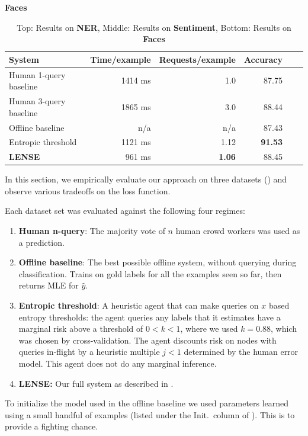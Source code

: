 \begin{table}[ht]
{\bf Faces}\\
\begin{tabular}{l  r  r  r  r  r}
    \textbf{System} & \textbf{Time/example} & \textbf{Requests/example} & \textbf{Accuracy} \\ \hline
    Human 1-query baseline & 1414 ms & 1.0 & 87.75 \\ %
    Human 3-query baseline & 1865 ms & 3.0 & 88.44 \\ %
    Offline baseline & n/a & n/a & 87.43 \\    %
    Entropic threshold & 1121 ms & 1.12 & \textbf{91.53} \\ %
    \textbf{LENSE} & 961 ms & \textbf{1.06} & 88.45 \\   %
\end{tabular}
  \caption{Top: Results on {\bf NER}, Middle: Results on {\bf Sentiment}, Bottom: Results on {\bf Faces}}
\end{table}

In this section, we empirically evaluate our approach on three datasets () and observe various tradeoffs on the loss function.

Each dataset set was evaluated against the following four regimes:
\begin{enumerate}
  \item {\bf Human n-query}: The majority vote of $n$ human crowd workers was used as a prediction.
  \item {\bf Offline baseline}: The best possible offline system, without querying during classification. Trains on gold labels for all the examples seen so far, then returns MLE for $\hat{y}$.
  \item {\bf Entropic threshold}: A heuristic agent that can make queries on $x$ based entropy thresholds: the agent queries any labels that it estimates have a marginal risk above a threshold of $0 < k < 1$, where we used $k = 0.88$, which was chosen by cross-validation. The agent discounts risk on nodes with queries in-flight by a heuristic multiple $j < 1$ determined by the human error model. This agent does not do any marginal inference.
  \item {\bf LENSE:} Our full system as described in .
\end{enumerate}

To initialize the model used in the offline baseline we used parameters learned using a small handful of examples (listed under the Init.\ column of ). This is to provide a fighting chance.

